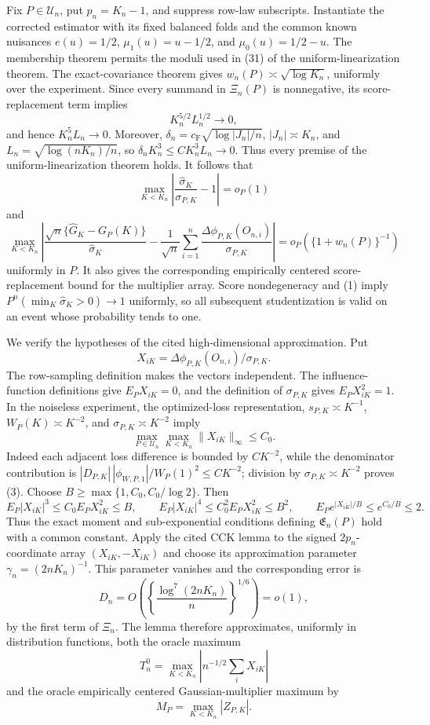 Fix \(P\in\mathcal U_n\), put \(p_n=K_n-1\), and suppress row-law subscripts.  Instantiate the corrected estimator with its fixed balanced folds and the common known nuisances \(e(u)=1/2\), \(\mu_1(u)=u-1/2\), and \(\mu_0(u)=1/2-u\).  The membership theorem permits the moduli used in (31) of the uniform-linearization theorem.  The exact-covariance theorem gives \(w_n(P)\asymp\sqrt{\log K_n}\), uniformly over the experiment.  Since every summand in \(\Xi_n(P)\) is nonnegative, its score-replacement term implies
\[
 K_n^{5/2}L_n^{1/2}\longrightarrow0,
\]
and hence \(K_n^5L_n\to0\).  Moreover, \(\delta_n=c_{\mathrm F}\sqrt{\log|J_n|/n}\), \(|J_n|\asymp K_n\), and \(L_n=\sqrt{\log(nK_n)/n}\), so \(\delta_nK_n^3\leq C K_n^3L_n\to0\).  Thus every premise of the uniform-linearization theorem holds.  It follows that
\[
 \max_{K<K_n}\left|\frac{\widehat\sigma_K}{\sigma_{P,K}}-1\right|=o_P(1)  \tag{1}
\]
and
\[
 \max_{K<K_n}\left|
 \frac{\sqrt n\{\widehat G_K-G_P(K)\}}{\widehat\sigma_K}
 -\frac1{\sqrt n}\sum_{i=1}^n
 \frac{\Delta\phi_{P,K}(O_{n,i})}{\sigma_{P,K}}
 \right|=o_P\!\left(\{1+w_n(P)\}^{-1}\right)                              \tag{2}
\]
uniformly in \(P\).  It also gives the corresponding empirically centered score-replacement bound for the multiplier array.  Score nondegeneracy and (1) imply \(P^n(\min_K\widehat\sigma_K>0)\to1\) uniformly, so all subsequent studentization is valid on an event whose probability tends to one.

We verify the hypotheses of the cited high-dimensional approximation.  Put
\[
 X_{iK}=\Delta\phi_{P,K}(O_{n,i})/\sigma_{P,K}.
\]
The row-sampling definition makes the vectors independent.  The influence-function definitions give \(E_PX_{iK}=0\), and the definition of \(\sigma_{P,K}\) gives \(E_PX_{iK}^2=1\).  In the noiseless experiment, the optimized-loss representation, \(s_{P,K}\asymp K^{-1}\), \(W_P(K)\asymp K^{-2}\), and \(\sigma_{P,K}\asymp K^{-2}\) imply
\[
 \max_{P\in\mathcal U_n}\max_{K<K_n}\|X_{iK}\|_\infty\leq C_0.           \tag{3}
\]
Indeed each adjacent loss difference is bounded by \(C K^{-2}\), while the denominator contribution is \(|D_{P,K}|\,|\phi_{W,P,1}|/W_P(1)^2\leq CK^{-2}\); division by \(\sigma_{P,K}\asymp K^{-2}\) proves (3).  Choose \(B\geq\max\{1,C_0,C_0/\log2\}\).  Then
\[
 E_P|X_{iK}|^3\leq C_0E_PX_{iK}^2\leq B,\qquad
 E_P|X_{iK}|^4\leq C_0^2E_PX_{iK}^2\leq B^2,
 \qquad E_Pe^{|X_{iK}|/B}\leq e^{C_0/B}\leq2.                              \tag{4}
\]
Thus the exact moment and sub-exponential conditions defining \(\mathfrak E_n(P)\) hold with a common constant.  Apply the cited CCK lemma to the signed \(2p_n\)-coordinate array \((X_{iK},-X_{iK})\) and choose its approximation parameter \(\gamma_n=(2nK_n)^{-1}\).  This parameter vanishes and the corresponding error is
\[
 D_n=O\!\left(\left\{\frac{\log^7(2nK_n)}n\right\}^{1/6}\right)=o(1),     \tag{5}
\]
by the first term of \(\Xi_n\).  The lemma therefore approximates, uniformly in distribution functions, both the oracle maximum
\[
 T_n^0=\max_{K<K_n}\left|n^{-1/2}\sum_iX_{iK}\right|                       \tag{6}
\]
and the oracle empirically centered Gaussian-multiplier maximum by
\[
 M_P=\max_{K<K_n}|Z_{P,K}|.                                                  \tag{7}
\]

